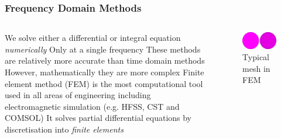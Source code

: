 \documentclass[10pt]{beamer}
\begin{document}
\begin{frame}
    \frametitle{Frequency Domain Methods}
    \begin{columns}[T] %
        \begin{column}{.6\textwidth}
            \begin{outline}
                \1 We solve either a differential or integral equation \textit{numerically}
                \2 Only at a single frequency
                \1 These methods are relatively more accurate than time domain methods
                \2 However, mathematically they are more complex
                \1 Finite element method (FEM) is the most computational tool used in all areas of engineering including electromagnetic simulation (e.g. HFSS, CST and COMSOL)
                \2 It solves partial differential equations by discretisation into \textit{finite elements}
            \end{outline}
        \end{column}
        \begin{column}{.4\textwidth}
            \begin{figure}[B!]
                \centering
                \includegraphics[width=1\textwidth]{mesh.pdf}
                \caption{Typical mesh in FEM}
            \end{figure}
        \end{column}%
    \end{columns}

\end{frame}
\end{document}
